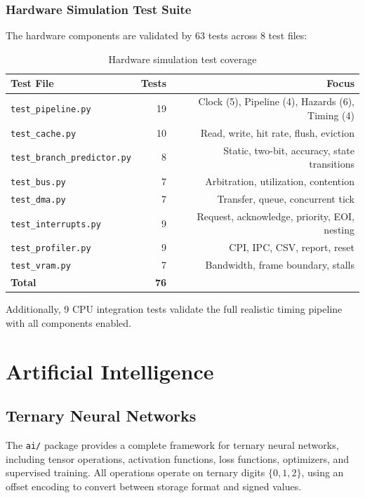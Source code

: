 \documentclass[10pt,a4paper,twoside]{book}
\begin{document}
\section{Hardware Simulation Test Suite}

The hardware components are validated by 63 tests across 8 test files:

\begin{table}[H]
\centering
\caption{Hardware simulation test coverage}
\label{tab:hwtests}
\begin{tabular}{lrr}
\toprule
Test File & Tests & Focus \\
\midrule
\texttt{test\_pipeline.py} & 19 & Clock (5), Pipeline (4), Hazards (6), Timing (4) \\
\texttt{test\_cache.py} & 10 & Read, write, hit rate, flush, eviction \\
\texttt{test\_branch\_predictor.py} & 8 & Static, two-bit, accuracy, state transitions \\
\texttt{test\_bus.py} & 7 & Arbitration, utilization, contention \\
\texttt{test\_dma.py} & 7 & Transfer, queue, concurrent tick \\
\texttt{test\_interrupts.py} & 9 & Request, acknowledge, priority, EOI, nesting \\
\texttt{test\_profiler.py} & 9 & CPI, IPC, CSV, report, reset \\
\texttt{test\_vram.py} & 7 & Bandwidth, frame boundary, stalls \\
\midrule
\textbf{Total} & \textbf{76} & \\
\bottomrule
\end{tabular}
\end{table}

Additionally, 9 CPU integration tests validate the full realistic timing
pipeline with all components enabled.

\part{Artificial Intelligence}

\chapter{Ternary Neural Networks}
\label{ch:nn}

The \texttt{ai/} package provides a complete framework for ternary neural
networks, including tensor operations, activation functions, loss
functions, optimizers, and supervised training. All operations operate
on ternary digits $\{0,1,2\}$, using an offset encoding to convert
between storage format and signed values.
\end{document}
